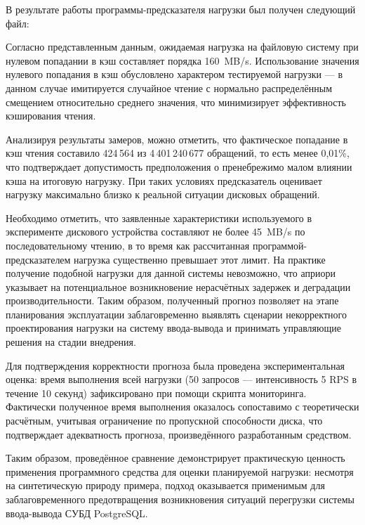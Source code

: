 В результате работы программы-предсказателя нагрузки был получен следующий файл:


Согласно представленным данным, ожидаемая нагрузка на файловую систему при нулевом попадании в кэш составляет порядка 160~MB/s. 
Использование значения нулевого попадания в кэш обусловлено характером тестируемой нагрузки — 
в данном случае имитируется случайное чтение с нормально распределённым смещением относительно среднего значения, 
что минимизирует эффективность кэширования чтения.


Анализируя результаты замеров, можно отметить, что фактическое попадание в кэш чтения составило 424\,564 из 4\,401\,240\,677 
обращений, то есть менее 0{,}01\%, что подтверждает допустимость предположения о пренебрежимо малом влиянии кэша на итоговую нагрузку. 
При таких условиях предсказатель оценивает нагрузку максимально близко к реальной ситуации дисковых обращений.

Необходимо отметить, что заявленные характеристики используемого в эксперименте дискового устройства составляют не более 45~MB/s 
по последовательному чтению, в то время как рассчитанная программой-предсказателем нагрузка существенно превышает этот лимит. 
На практике получение подобной нагрузки для данной системы невозможно, что априори указывает на потенциальное возникновение нерасчётных 
задержек и деградации производительности. Таким образом, полученный прогноз позволяет на этапе планирования эксплуатации заблаговременно 
выявлять сценарии некорректного проектирования нагрузки на систему ввода-вывода и принимать управляющие решения на стадии внедрения.

Для подтверждения корректности прогноза была проведена экспериментальная оценка: время выполнения всей нагрузки 
(50 запросов — интенсивность 5 RPS в течение 10 секунд) зафиксировано при помощи скрипта мониторинга. 
Фактически полученное время выполнения оказалось сопоставимо с теоретически расчётным, учитывая ограничение по пропускной способности диска, 
что подтверждает адекватность прогноза, произведённого разработанным средством.

Таким образом, проведённое сравнение демонстрирует практическую ценность применения программного средства для оценки планируемой нагрузки: 
несмотря на синтетическую природу примера, подход оказывается применимым для заблаговременного предотвращения 
возникновения ситуаций перегрузки системы ввода-вывода СУБД PostgreSQL.


